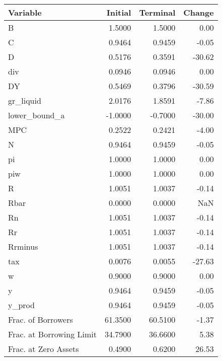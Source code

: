 \begin{table}
\centering
\label{tab:stst_labour}
\begin{tabular}{lrrr}
\toprule
                Variable &  Initial &  Terminal &  Change \\
\midrule
                       B &   1.5000 &    1.5000 &    0.00 \\
                       C &   0.9464 &    0.9459 &   -0.05 \\
                       D &   0.5176 &    0.3591 &  -30.62 \\
                     div &   0.0946 &    0.0946 &    0.00 \\
                      DY &   0.5469 &    0.3796 &  -30.59 \\
               gr\_liquid &   2.0176 &    1.8591 &   -7.86 \\
           lower\_bound\_a &  -1.0000 &   -0.7000 &  -30.00 \\
                     MPC &   0.2522 &    0.2421 &   -4.00 \\
                       N &   0.9464 &    0.9459 &   -0.05 \\
                      pi &   1.0000 &    1.0000 &    0.00 \\
                     piw &   1.0000 &    1.0000 &    0.00 \\
                       R &   1.0051 &    1.0037 &   -0.14 \\
                    Rbar &   0.0000 &    0.0000 &     NaN \\
                      Rn &   1.0051 &    1.0037 &   -0.14 \\
                      Rr &   1.0051 &    1.0037 &   -0.14 \\
                 Rrminus &   1.0051 &    1.0037 &   -0.14 \\
                     tax &   0.0076 &    0.0055 &  -27.63 \\
                       w &   0.9000 &    0.9000 &    0.00 \\
                       y &   0.9464 &    0.9459 &   -0.05 \\
                  y\_prod &   0.9464 &    0.9459 &   -0.05 \\
      Frac. of Borrowers &  61.3500 &   60.5100 &   -1.37 \\
Frac. at Borrowing Limit &  34.7900 &   36.6600 &    5.38 \\
    Frac. at Zero Assets &   0.4900 &    0.6200 &   26.53 \\
\bottomrule
\end{tabular}
\end{table}

